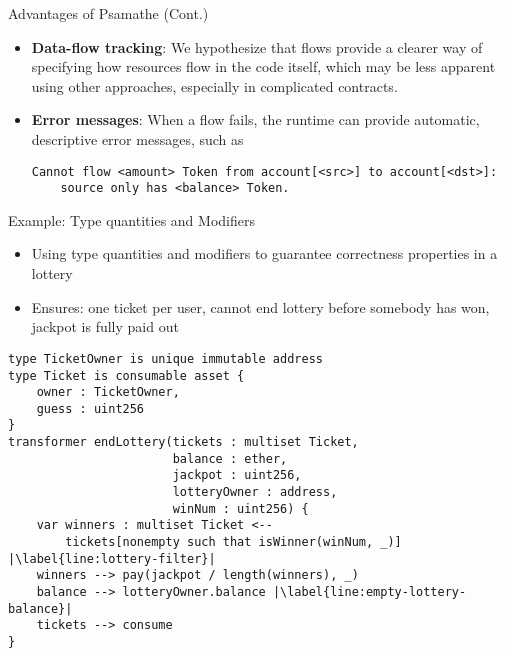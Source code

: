 \documentclass[leqno,presentation,usenames,dvipsnames]{beamer}
\begin{document}
\begin{frame}[fragile]{Advantages of Psamathe (Cont.)}
    \begin{itemize}
        \item \textbf{Data-flow tracking}: We hypothesize that flows provide a clearer way of specifying how resources flow in the code itself, which may be less apparent using other approaches, especially in complicated contracts.
        \item \textbf{Error messages}: When a flow fails, the \langName runtime can provide automatic, descriptive error messages, such as
\begin{lstlisting}[numbers=none, basicstyle=\footnotesize\ttfamily, xleftmargin=-4.5em]
Cannot flow <amount> Token from account[<src>] to account[<dst>]:
    source only has <balance> Token.
\end{lstlisting}
    \end{itemize}
\end{frame}

\begin{frame}[fragile]{Example: Type quantities and Modifiers}
    \begin{itemize}
        \item Using type quantities and modifiers to guarantee correctness properties in a lottery
        \item Ensures: one ticket per user, cannot end lottery before somebody has won, jackpot is fully paid out
    \end{itemize}
\begin{lstlisting}[language=flow, xleftmargin=-0.2em, basicstyle=\scriptsize\ttfamily]
type TicketOwner is unique immutable address
type Ticket is consumable asset {
    owner : TicketOwner,
    guess : uint256
}
transformer endLottery(tickets : multiset Ticket,
                       balance : ether,
                       jackpot : uint256,
                       lotteryOwner : address,
                       winNum : uint256) {
    var winners : multiset Ticket <--
        tickets[nonempty such that isWinner(winNum, _)] |\label{line:lottery-filter}|
    winners --> pay(jackpot / length(winners), _)
    balance --> lotteryOwner.balance |\label{line:empty-lottery-balance}|
    tickets --> consume
}
\end{lstlisting}
\end{frame}
\end{document}
